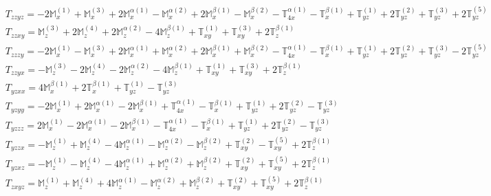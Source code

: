 \documentclass[fleqn,8pt,landscape]{jsarticle}
\begin{document}
\begin{align*}
& T_{zzyz} = - 2 \mathbb{M}_{x}^{(1)} + \mathbb{M}_{x}^{(3)} + 2 \mathbb{M}_{x}^{\alpha(1)} - \mathbb{M}_{x}^{\alpha(2)} + 2 \mathbb{M}_{x}^{\beta(1)} - \mathbb{M}_{x}^{\beta(2)} - \mathbb{T}_{4x}^{\alpha(1)} - \mathbb{T}_{x}^{\beta(1)} + \mathbb{T}_{yz}^{(1)} + 2 \mathbb{T}_{yz}^{(2)} + \mathbb{T}_{yz}^{(3)} + 2 \mathbb{T}_{yz}^{(5)} \\
& T_{zzxy} = \mathbb{M}_{z}^{(3)} + 2 \mathbb{M}_{z}^{(4)} + 2 \mathbb{M}_{z}^{\alpha(2)} - 4 \mathbb{M}_{z}^{\beta(1)} + \mathbb{T}_{xy}^{(1)} + \mathbb{T}_{xy}^{(3)} + 2 \mathbb{T}_{z}^{\beta(1)} \\
& T_{zzzy} = - 2 \mathbb{M}_{x}^{(1)} - \mathbb{M}_{x}^{(3)} + 2 \mathbb{M}_{x}^{\alpha(1)} + \mathbb{M}_{x}^{\alpha(2)} + 2 \mathbb{M}_{x}^{\beta(1)} + \mathbb{M}_{x}^{\beta(2)} - \mathbb{T}_{4x}^{\alpha(1)} - \mathbb{T}_{x}^{\beta(1)} + \mathbb{T}_{yz}^{(1)} + 2 \mathbb{T}_{yz}^{(2)} + \mathbb{T}_{yz}^{(3)} - 2 \mathbb{T}_{yz}^{(5)} \\
& T_{zzyx} = - \mathbb{M}_{z}^{(3)} - 2 \mathbb{M}_{z}^{(4)} - 2 \mathbb{M}_{z}^{\alpha(2)} - 4 \mathbb{M}_{z}^{\beta(1)} + \mathbb{T}_{xy}^{(1)} + \mathbb{T}_{xy}^{(3)} + 2 \mathbb{T}_{z}^{\beta(1)} \\
& T_{yzxx} = 4 \mathbb{M}_{x}^{\beta(1)} + 2 \mathbb{T}_{x}^{\beta(1)} + \mathbb{T}_{yz}^{(1)} - \mathbb{T}_{yz}^{(3)} \\
& T_{yzyy} = - 2 \mathbb{M}_{x}^{(1)} + 2 \mathbb{M}_{x}^{\alpha(1)} - 2 \mathbb{M}_{x}^{\beta(1)} + \mathbb{T}_{4x}^{\alpha(1)} - \mathbb{T}_{x}^{\beta(1)} + \mathbb{T}_{yz}^{(1)} + 2 \mathbb{T}_{yz}^{(2)} - \mathbb{T}_{yz}^{(3)} \\
& T_{yzzz} = 2 \mathbb{M}_{x}^{(1)} - 2 \mathbb{M}_{x}^{\alpha(1)} - 2 \mathbb{M}_{x}^{\beta(1)} - \mathbb{T}_{4x}^{\alpha(1)} - \mathbb{T}_{x}^{\beta(1)} + \mathbb{T}_{yz}^{(1)} + 2 \mathbb{T}_{yz}^{(2)} - \mathbb{T}_{yz}^{(3)} \\
& T_{yzzx} = - \mathbb{M}_{z}^{(1)} + \mathbb{M}_{z}^{(4)} - 4 \mathbb{M}_{z}^{\alpha(1)} - \mathbb{M}_{z}^{\alpha(2)} - \mathbb{M}_{z}^{\beta(2)} + \mathbb{T}_{xy}^{(2)} - \mathbb{T}_{xy}^{(5)} + 2 \mathbb{T}_{z}^{\beta(1)} \\
& T_{yzxz} = - \mathbb{M}_{z}^{(1)} - \mathbb{M}_{z}^{(4)} - 4 \mathbb{M}_{z}^{\alpha(1)} + \mathbb{M}_{z}^{\alpha(2)} + \mathbb{M}_{z}^{\beta(2)} + \mathbb{T}_{xy}^{(2)} + \mathbb{T}_{xy}^{(5)} + 2 \mathbb{T}_{z}^{\beta(1)} \\
& T_{zxyz} = \mathbb{M}_{z}^{(1)} + \mathbb{M}_{z}^{(4)} + 4 \mathbb{M}_{z}^{\alpha(1)} - \mathbb{M}_{z}^{\alpha(2)} + \mathbb{M}_{z}^{\beta(2)} + \mathbb{T}_{xy}^{(2)} + \mathbb{T}_{xy}^{(5)} + 2 \mathbb{T}_{z}^{\beta(1)} \\

\end{align*}
\end{document}
